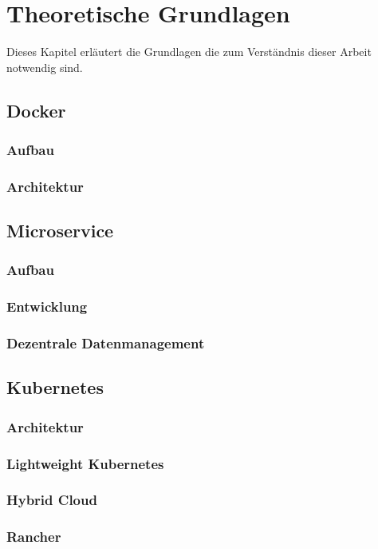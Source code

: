 \chapter{Theoretische Grundlagen}
Dieses Kapitel erläutert die Grundlagen die zum 
Verständnis dieser Arbeit notwendig sind.



\section{Docker}

\subsection{Aufbau}
\subsection{Architektur}

\section{Microservice}
\subsection{Aufbau}
\subsection{Entwicklung}
\subsection{Dezentrale Datenmanagement}


\section{Kubernetes}
\subsection{Architektur}
\subsection{Lightweight Kubernetes}
\subsection{Hybrid Cloud}
\subsection{Rancher}


